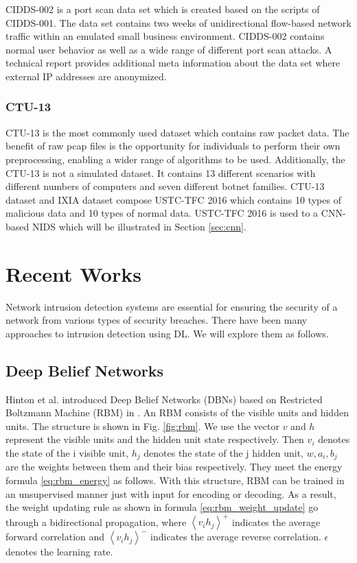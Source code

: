 \documentclass[conference]{IEEEtran}
\begin{document}
CIDDS-002 is a port scan data set which is created based on the scripts of CIDDS-001. The data set contains two weeks of unidirectional flow-based network traffic within an emulated small business environment. CIDDS-002 contains normal user behavior as well as a wide range of different port scan attacks. A technical report provides additional meta information about the data set where external IP addresses are anonymized. 


\subsubsection{CTU-13}
CTU-13 is the most commonly used dataset which contains raw packet data. The benefit of raw pcap files is the opportunity  for individuals to perform their own preprocessing, enabling a wider range of algorithms to be used. Additionally, the CTU-13 is not a simulated dataset. It contains 13 different scenarios with different numbers of computers and seven different botnet families. CTU-13 dataset and IXIA dataset compose USTC-TFC 2016 which contains 10 types of malicious data and 10 types of normal data. USTC-TFC 2016 is used to a CNN-based NIDS which will be illustrated in Section \ref{sec:cnn}.


\section{Recent Works}
Network intrusion detection systems are essential for ensuring the security of a network from various types of security breaches. There have been many approaches to intrusion detection using DL. We will explore them as follows.

\subsection{Deep Belief Networks}
Hinton et al. introduced Deep Belief Networks (DBNs) based on Restricted Boltzmann Machine (RBM) in \cite{hinton2006fast}. An RBM consists of the visible units and hidden units. The structure is shown in Fig. \ref{fig:rbm}. We use the vector $v$ and $h$ represent the visible units and the hidden unit state respectively. Then $v_i$ denotes the state of the i visible unit, $h_j$ denotes the state of the j hidden unit, $w, a_i, b_j$ are the weights between them and their bias respectively. They meet the energy formula \ref{eq:rbm_energy} as follows. With this structure, RBM can be trained in an unsupervised manner just with input for encoding or decoding. As a result, the weight updating rule as shown in formula \ref{eq:rbm_weight_update} go through a bidirectional propagation, where $\left\langle v_i h_j \right\rangle ^+$ indicates the average forward correlation and $\left\langle v_i h_j \right\rangle ^-$ indicates the average reverse correlation. $\epsilon$ denotes the learning rate.
\end{document}
